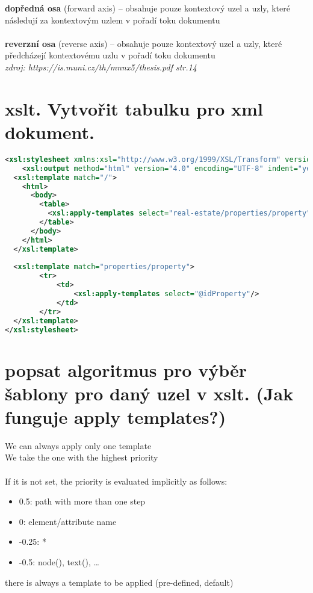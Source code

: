 \documentclass[a4paper,titlepage]{article}
\begin{document}
	\textbf{dopředná osa} (forward axis) – obsahuje pouze kontextový uzel a uzly, které následují
za kontextovým uzlem v pořadí toku dokumentu\\\\
	\textbf{reverzní osa} (reverse axis) – obsahuje pouze kontextový uzel a uzly, které předcházejí
kontextovému uzlu v pořadí toku dokumentu\\
	\textit{zdroj: https://is.muni.cz/th/mnnx5/thesis.pdf str.14}

\section{xslt. Vytvořit tabulku pro xml dokument.  }
	\begin{lstlisting}[language=XML]
<xsl:stylesheet xmlns:xsl="http://www.w3.org/1999/XSL/Transform" version="1.0">
    <xsl:output method="html" version="4.0" encoding="UTF-8" indent="yes" doctype-public="-//W3C//DTD XHTML 1.0 Strict//EN" doctype-system="http://www.w3.org/TR/xhtml1/DTD/xhtml1-strict.dtd" />
  <xsl:template match="/">
    <html>
      <body>
        <table>
          <xsl:apply-templates select="real-estate/properties/property"/>                        
        </table>
      </body>
    </html>
  </xsl:template>
    
  <xsl:template match="properties/property">
        <tr>
            <td>
                <xsl:apply-templates select="@idProperty"/>
            </td>
        </tr>
  </xsl:template>
</xsl:stylesheet>
	\end{lstlisting}
	
	
	
\section{popsat algoritmus pro výběr šablony pro daný uzel v xslt. (Jak funguje apply templates?) }
	We can always apply only one template\\
	We take the one with the highest priority\\\\
	If it is not set, the priority is evaluated implicitly as follows:	
	\begin{itemize}
		\item 0.5: path with more than one step
		\item 0: element/attribute name
		\item -0.25: *
		\item -0.5: node(), text(), …
	\end{itemize}
	there is always a template to be applied (pre-defined, default)
\end{document}

